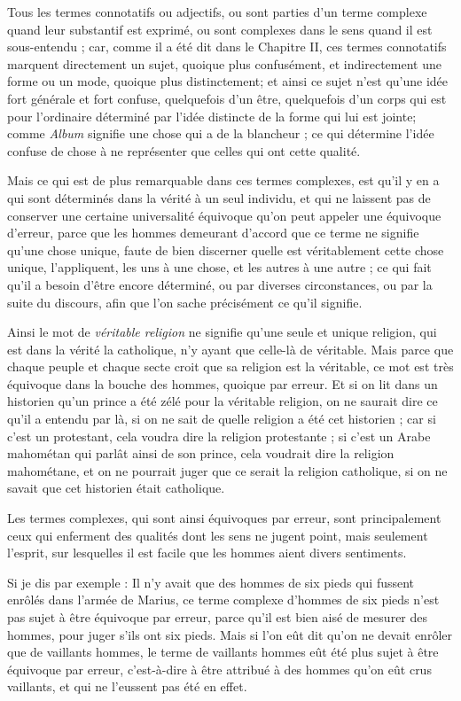 Tous les termes connotatifs ou adjectifs, ou sont parties d'un terme complexe quand leur substantif est exprimé, ou sont complexes dans le sens quand il est sous-entendu ; car, comme il a été dit dans le Chapitre II, ces termes connotatifs marquent directement un sujet, quoique plus confusément, et indirectement une forme ou un mode, quoique plus distinctement; et ainsi ce sujet n'est qu'une idée fort générale et fort confuse, quelquefois d'un être, quelquefois d'un corps qui est pour l'ordinaire déterminé par l'idée distincte de la forme qui lui est jointe; comme \emph{Album} signifie une chose qui a de la blancheur ; ce qui détermine l'idée confuse de chose à ne représenter que celles qui ont cette qualité.

Mais ce qui est de plus remarquable dans ces termes complexes, est qu'il y en a qui sont déterminés dans la vérité à un seul individu, et qui ne laissent pas de conserver une certaine universalité équivoque qu'on peut appeler une équivoque d'erreur, parce que les hommes demeurant d'accord que ce terme ne signifie qu'une chose unique, faute de bien discerner quelle est véritablement cette chose unique, l'appliquent, les uns à une chose, et les autres à une autre ; ce qui fait qu'il a besoin d'être encore déterminé, ou par diverses circonstances, ou par la suite du discours, afin que l'on sache précisément ce qu'il signifie.

Ainsi le mot de \emph{véritable religion} ne signifie qu'une seule et unique religion, qui est dans la vérité la catholique, n'y ayant que celle-là de véritable. Mais parce que chaque peuple et chaque secte croit que sa religion est la véritable, ce mot est très équivoque dans la bouche des hommes, quoique par erreur. Et si on lit dans un historien qu'un prince a été zélé pour la véritable religion, on ne saurait dire ce qu'il a entendu par là, si on ne sait de quelle religion a été cet historien ; car si c'est un protestant, cela voudra dire la religion protestante ; si c'est un Arabe mahométan qui parlât ainsi de son prince, cela voudrait dire la religion mahométane, et on ne pourrait juger que ce serait la religion catholique, si on ne savait que cet historien était catholique.

Les termes complexes, qui sont ainsi équivoques par erreur, sont principalement ceux qui enferment des qualités dont les sens ne jugent point, mais seulement l'esprit, sur lesquelles il est facile que les hommes aient divers sentiments.

Si je dis par exemple : Il n'y avait que des hommes de six pieds qui fussent enrôlés dans l'armée de Marius, ce terme complexe d'hommes de six pieds n'est pas sujet à être équivoque par erreur, parce qu'il est bien aisé de mesurer des hommes, pour juger s'ils ont six pieds. Mais si l'on eût dit qu'on ne devait enrôler que de vaillants hommes, le terme de vaillants hommes eût été plus sujet à être équivoque par erreur, c'est-à-dire à être attribué à des hommes qu'on eût crus vaillants, et qui ne l'eussent pas été en effet.

